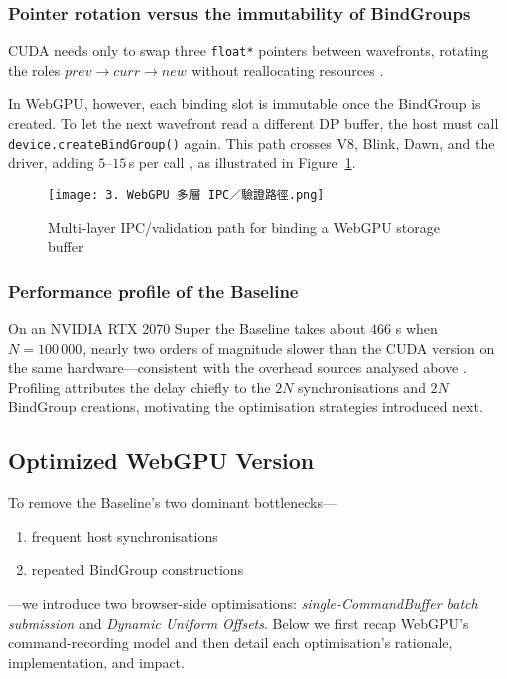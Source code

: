 \documentclass[PhD]{PHlab-thesis}
\begin{document}
\subsubsection{Pointer rotation versus the immutability of BindGroups}
CUDA needs only to swap three \texttt{float*} pointers between wavefronts, rotating the roles $\textit{prev}\!\rightarrow\!\textit{curr}\!\rightarrow\!\textit{new}$ without reallocating resources \cite{NVIDIA2023-cudaguide}.

In WebGPU, however, each binding slot is immutable once the BindGroup is created. To let the next wavefront read a different DP buffer, the host must call \texttt{device.createBindGroup()} again. This path crosses V8, Blink, Dawn, and the driver, adding $5$–$15$\,\textmu s per call \cite{Chrome2024-blog}, as illustrated in Figure~\ref{fig:webgpu-ipc-validation}.

\begin{figure}[htbp]
    \centering
    \texttt{[image: 3. WebGPU 多層 IPC／驗證路徑.png]}
    \caption{Multi-layer IPC/validation path for binding a WebGPU storage buffer}
    \label{fig:webgpu-ipc-validation}
\end{figure}

\subsubsection{Performance profile of the Baseline}
On an NVIDIA RTX 2070 Super the Baseline takes about $466$ s when $N=100\,000$, nearly two orders of magnitude slower than the CUDA version on the same hardware—consistent with the overhead sources analysed above \cite{Chrome2024-blog}. Profiling attributes the delay chiefly to the $2N$ synchronisations and $2N$ BindGroup creations, motivating the optimisation strategies introduced next.





\subsection{Optimized WebGPU Version}

To remove the Baseline’s two dominant bottlenecks—
\begin{enumerate}
  \item frequent host synchronisations
  \item repeated BindGroup constructions
\end{enumerate}
—we introduce two browser-side optimisations: \emph{single-CommandBuffer batch submission} and \emph{Dynamic Uniform Offsets}. Below we first recap WebGPU’s command-recording model \cite{W3C2024-webgpu} and then detail each optimisation’s rationale, implementation, and impact.
\end{document}
